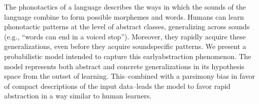 The phonotactics of a language describes the ways in which the sounds of the language combine to form possible morphemes and words. Humans can learn phonotactic patterns at the level of abstract classes, generalizing across sounds (e.g., ``words can end in a voiced stop''). Moreover, they rapidly acquire these generalizations, even before they acquire soundspecific patterns. We present a probabilistic model intended to capture this earlyabstraction phenomenon. The model represents both abstract and concrete generalizations in its hypothesis space from the outset of learning. This--combined with a parsimony bias in favor of compact descriptions of the input data--leads the model to favor rapid abstraction in a way similar to human learners.
